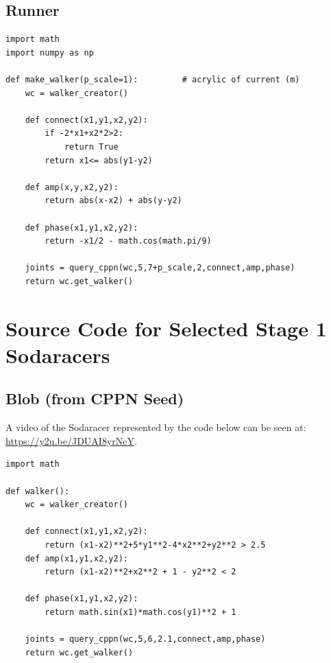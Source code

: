\documentclass{article}
\begin{document}
\subsection{Runner}

\begin{verbatim}
import math
import numpy as np

def make_walker(p_scale=1):         # acrylic of current (m)
    wc = walker_creator()

    def connect(x1,y1,x2,y2):
        if -2*x1+x2*2>2:
            return True
        return x1<= abs(y1-y2)

    def amp(x,y,x2,y2):
        return abs(x-x2) + abs(y-y2)

    def phase(x1,y1,x2,y2):
        return -x1/2 - math.cos(math.pi/9)

    joints = query_cppn(wc,5,7+p_scale,2,connect,amp,phase)
    return wc.get_walker()
\end{verbatim}

\section{Source Code for Selected Stage 1 Sodaracers}
\label{appendix:source_code}

\subsection{Blob (from CPPN Seed)}

A video of the Sodaracer represented by the code below can be seen at: \url{https://y2u.be/JDUAI8yrNcY}.



\begin{verbatim}
import math

def walker():
    wc = walker_creator()

    def connect(x1,y1,x2,y2):
        return (x1-x2)**2+5*y1**2-4*x2**2+y2**2 > 2.5
    def amp(x1,y1,x2,y2):
        return (x1-x2)**2+x2**2 + 1 - y2**2 < 2

    def phase(x1,y1,x2,y2):
        return math.sin(x1)*math.cos(y1)**2 + 1

    joints = query_cppn(wc,5,6,2.1,connect,amp,phase)
    return wc.get_walker()
\end{verbatim}
\end{document}
